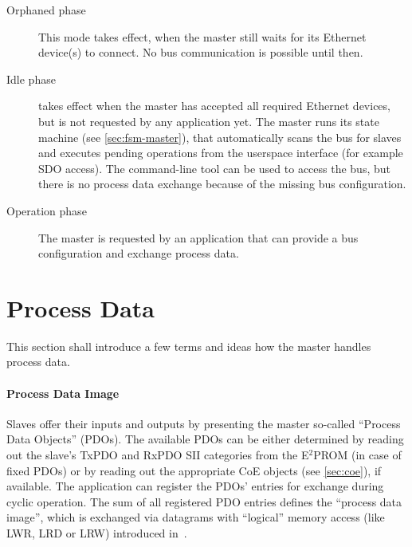 \documentclass[a4paper,12pt,BCOR6mm,bibtotoc,idxtotoc]{scrbook}
\begin{document}
\begin{description}

\item[Orphaned phase] This mode takes effect, when the
master still waits for its Ethernet device(s) to connect. No bus communication
is possible until then.

\item[Idle phase] takes effect when the master has accepted
all required Ethernet devices, but is not requested by any application yet.
The master runs its state machine (see \autoref{sec:fsm-master}), that
automatically scans the bus for slaves and executes pending operations from
the userspace interface (for example SDO access). The command-line tool can be
used to access the bus, but there is no process data exchange because of the
missing bus configuration.

\item[Operation phase] The master is requested by an
application that can provide a bus configuration and exchange process data.

\end{description}


\section{Process Data}
\label{sec:processdata}

This section shall introduce a few terms and ideas how the master handles
process data.

\paragraph{Process Data Image}

Slaves offer their inputs and outputs by presenting the master so-called
``Process Data Objects'' (PDOs). The available PDOs can be either
determined by reading out the slave's TxPDO and RxPDO SII categories from the
E$^2$PROM (in case of fixed PDOs) or by reading out the appropriate CoE
objects (see \autoref{sec:coe}), if available.  The application can register
the PDOs' entries for exchange during cyclic operation. The sum of all
registered PDO entries defines the ``process data image'', which is exchanged
via datagrams with ``logical'' memory access (like LWR, LRD or LRW) introduced
in~\cite[sec.~5.4]{dlspec}.
\end{document}
